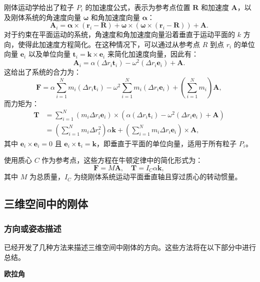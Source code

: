 刚体运动学给出了粒子 \( P_i \) 的加速度公式，表示为参考点位置 \( \mathbf{R} \) 和加速度 \( \mathbf{A} \)，以及刚体系统的角速度向量 \( \boldsymbol{\omega} \) 和角加速度向量 \( \boldsymbol{\alpha} \)：
\[
\mathbf{A}_i = \boldsymbol{\alpha} \times (\mathbf{r}_i - \mathbf{R}) + \boldsymbol{\omega} \times (\boldsymbol{\omega} \times (\mathbf{r}_i - \mathbf{R})) + \mathbf{A}.~
\]
对于约束在平面运动的系统，角速度和角加速度向量沿着垂直于运动平面的 \( k \) 方向，使得此加速度方程简化。在这种情况下，可以通过从参考点 \( R \) 到点 \( r_i \) 的单位向量 \( \mathbf{e}_i \) 以及单位向量 \( \mathbf{t}_i = \mathbf{k} \times \mathbf{e}_i \) 来简化加速度向量，因此有：
\[
\mathbf{A}_i = \alpha (\Delta r_i \mathbf{t}_i) - \omega^2 (\Delta r_i \mathbf{e}_i) + \mathbf{A}.~
\]
这给出了系统的合力为：
\[
\mathbf{F} = \alpha \sum_{i=1}^{N} m_{i} \left( \Delta r_{i} \mathbf{t}_{i} \right) - \omega^2 \sum_{i=1}^{N} m_{i} \left( \Delta r_{i} \mathbf{e}_{i} \right) + \left( \sum_{i=1}^{N} m_{i} \right) \mathbf{A},~
\]
而力矩为：
\begin{equation}
\begin{aligned}
\mathbf{T} &= \sum_{i=1}^{N} (m_{i} \Delta r_{i} \mathbf{e}_{i}) \times \left( \alpha (\Delta r_{i} \mathbf{t}_{i}) - \omega^2 (\Delta r_{i} \mathbf{e}_{i}) + \mathbf{A} \right) \\
&= \left( \sum_{i=1}^{N} m_{i} \Delta r_{i}^{2} \right) \alpha \mathbf{k} + \left( \sum_{i=1}^{N} m_{i} \Delta r_{i} \mathbf{e}_{i} \right) \times \mathbf{A},
\end{aligned}~
\end{equation}
其中 \( \mathbf{e}_{i} \times \mathbf{e}_{i} = 0 \) 且 \( \mathbf{e}_{i} \times \mathbf{t}_{i} = \mathbf{k} \)，即垂直于平面的单位向量，适用于所有粒子 \( P_i \)。

使用质心 \( C \) 作为参考点，这些方程在牛顿定律中的简化形式为：
\[
\mathbf{F} = M \mathbf{A}, \quad \mathbf{T} = I_C \alpha \mathbf{k},~
\]
其中 \( M \) 为总质量，\( I_C \) 为绕刚体系统运动平面垂直轴且穿过质心的转动惯量。
\subsection{三维空间中的刚体}
\subsubsection{方向或姿态描述}    
已经开发了几种方法来描述三维空间中刚体的方向。这些方法将在以下部分中进行总结。

\textbf{欧拉角}
  
